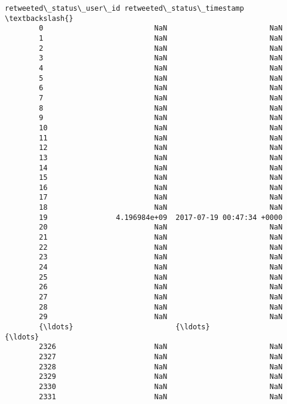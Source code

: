 \documentclass[11pt]{article}
\begin{document}
\begin{Verbatim}[commandchars=\\\{\}]
              retweeted\_status\_user\_id retweeted\_status\_timestamp  \textbackslash{}
        0                          NaN                        NaN   
        1                          NaN                        NaN   
        2                          NaN                        NaN   
        3                          NaN                        NaN   
        4                          NaN                        NaN   
        5                          NaN                        NaN   
        6                          NaN                        NaN   
        7                          NaN                        NaN   
        8                          NaN                        NaN   
        9                          NaN                        NaN   
        10                         NaN                        NaN   
        11                         NaN                        NaN   
        12                         NaN                        NaN   
        13                         NaN                        NaN   
        14                         NaN                        NaN   
        15                         NaN                        NaN   
        16                         NaN                        NaN   
        17                         NaN                        NaN   
        18                         NaN                        NaN   
        19                4.196984e+09  2017-07-19 00:47:34 +0000   
        20                         NaN                        NaN   
        21                         NaN                        NaN   
        22                         NaN                        NaN   
        23                         NaN                        NaN   
        24                         NaN                        NaN   
        25                         NaN                        NaN   
        26                         NaN                        NaN   
        27                         NaN                        NaN   
        28                         NaN                        NaN   
        29                         NaN                        NaN   
        {\ldots}                        {\ldots}                        {\ldots}   
        2326                       NaN                        NaN   
        2327                       NaN                        NaN   
        2328                       NaN                        NaN   
        2329                       NaN                        NaN   
        2330                       NaN                        NaN   
        2331                       NaN                        NaN   

\end{Verbatim}
\end{document}

